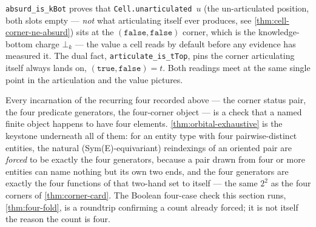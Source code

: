 \begin{theorem}\label{thm:potential-is-kbot}\leanok{}
\texttt{absurd\_is\_kBot} proves that \texttt{Cell.unarticulated}~$u$ (the un-articulated position, both slots empty --- \emph{not} what articulating itself ever produces, see \cref{thm:cell-corner-ne-absurd}) sits at the $(\texttt{false}, \texttt{false})$ corner, which is the knowledge-bottom charge $\bot_k$ --- the value a cell reads by default before any evidence has measured it. The dual fact, \texttt{articulate\_is\_tTop}, pins the corner articulating itself always lands on, $(\texttt{true}, \texttt{false}) = t$. Both readings meet at the same single point in the articulation and the value pictures.
\end{theorem}

\begin{remark}\label{rem:orbital-is-keystone}
Every incarnation of the recurring four recorded above --- the corner status pair, the four predicate generators, the four-corner object --- is a check that a named finite object happens to have four elements. \cref{thm:orbital-exhaustive} is the keystone underneath all of them: for an entity type with four pairwise-distinct entities, the natural (Sym(E)-equivariant) reindexings of an oriented pair are \emph{forced} to be exactly the four generators, because a pair drawn from four or more entities can name nothing but its own two ends, and the four generators are exactly the four functions of that two-hand set to itself --- the same $2^2$ as the four corners of \cref{thm:corner-card}. The Boolean four-case check this section runs, \cref{thm:four-fold}, is a roundtrip confirming a count already forced; it is not itself the reason the count is four.
\end{remark}
